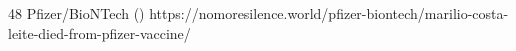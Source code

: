           {}
          {48}
          {Pfizer/BioNTech}
          {}
          {
             ()
          }
          {https://nomoresilence.world/pfizer-biontech/marilio-costa-leite-died-from-pfizer-vaccine/}



